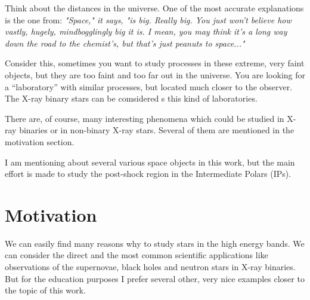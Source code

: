 \documentclass[oneside,a4paper,11pt]{report}
\begin{document}
Think about the distances in the universe. One of the most accurate explanations is the one from: \cite{hitch:1}  
\textit{"Space," it says, "is big. Really big. You just won't believe how vastly, 
hugely, mindbogglingly big it is. I mean, you may think it's a long way down the road to the 
chemist's, but that's just peanuts to space..."} 

Consider this, sometimes you want to study processes in these extreme, very faint objects, 
but they are too faint and too far out in the universe. You are looking for a “laboratory” with similar
 processes, but located much closer to the observer. The X-ray binary stars can be comsidered s this kind of 
laboratories.  

There are, of course, many interesting phenomena which could be studied in X-ray binaries or in non-binary X-ray stars. 
Several of them are mentioned in the motivation section. 

I am mentioning about several various space objects in this work, but the main effort is made to 
study the post-shock region in the Intermediate Polars (IPs).   


\section{Motivation}
We can easily find many reasons why to study stars in the high energy bands.  
We can consider the direct and the most common scientific applications like observations of 
the supernovae, black holes and neutron stars in X-ray binaries. But for the education purposes 
I prefer several other, very nice examples closer to the topic of this work.  
\end{document}
